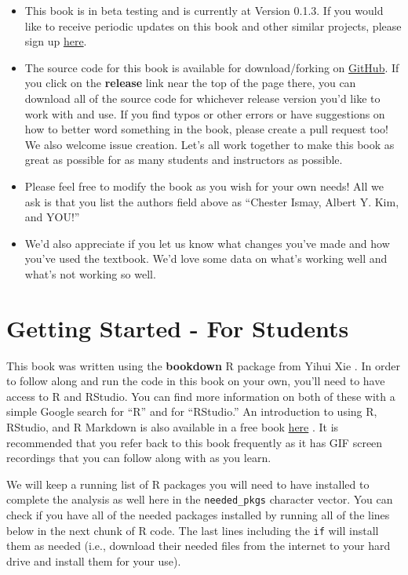 \documentclass[]{tufte-book}
\providecommand{\tightlist}{%
  \setlength{\itemsep}{0pt}\setlength{\parskip}{0pt}}
\theoremstyle{definition}
\theoremstyle{definition}
\theoremstyle{remark}
\begin{document}
\begin{itemize}
\tightlist
\item
  This book is in beta testing and is currently at Version 0.1.3. If you
  would like to receive periodic updates on this book and other similar
  projects, please sign up \href{http://eepurl.com/cBkItf}{here}.
\item
  The source code for this book is available for download/forking on
  \href{https://github.com/ismayc/moderndiver-book}{GitHub}. If you
  click on the \textbf{release} link near the top of the page there, you
  can download all of the source code for whichever release version
  you'd like to work with and use. If you find typos or other errors or
  have suggestions on how to better word something in the book, please
  create a pull request too! We also welcome issue creation. Let's all
  work together to make this book as great as possible for as many
  students and instructors as possible.
\item
  Please feel free to modify the book as you wish for your own needs!
  All we ask is that you list the authors field above as ``Chester
  Ismay, Albert Y. Kim, and YOU!''
\item
  We'd also appreciate if you let us know what changes you've made and
  how you've used the textbook. We'd love some data on what's working
  well and what's not working so well.
\end{itemize}

\section{Getting Started - For
Students}\label{getting-started---for-students}

This book was written using the \textbf{bookdown} R package from Yihui
Xie \citep{R-bookdown}. In order to follow along and run the code in
this book on your own, you'll need to have access to R and RStudio. You
can find more information on both of these with a simple Google search
for ``R'' and for ``RStudio.'' An introduction to using R, RStudio, and
R Markdown is also available in a free book
\href{http://ismayc.github.io/rbasics-book}{here} \citep{usedtor2016}.
It is recommended that you refer back to this book frequently as it has
GIF screen recordings that you can follow along with as you learn.

We will keep a running list of R packages you will need to have
installed to complete the analysis as well here in the
\texttt{needed\_pkgs} character vector. You can check if you have all of
the needed packages installed by running all of the lines below in the
next chunk of R code. The last lines including the \texttt{if} will
install them as needed (i.e., download their needed files from the
internet to your hard drive and install them for your use).
\end{document}
